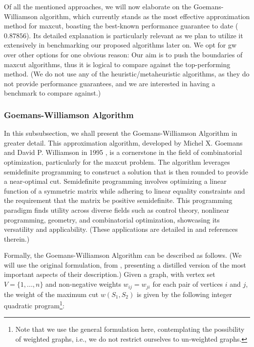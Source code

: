 Of all the mentioned approaches, we will now elaborate on the Goemans-Williamson algorithm, which currently stands as the most effective approximation method for \acrshort{maxcut}, boasting the best-known performance guarantee to date ($0.87856$). Its detailed explanation is particularly relevant as we plan to utilize it extensively in benchmarking our proposed algorithms later on. We opt for \acrshort{gw} over other options for one obvious reason: Our aim is to push the boundaries of \acrshort{maxcut} algorithms, thus it is logical to compare against the top-performing method. (We do not use any of the heuristic/metaheuristic algorithms, as they do not provide performance guarantees, and we are interested in having a benchmark to compare against.)

\subsubsection{Goemans-Williamson Algorithm}
\label{subsubsection:GW_Algorithm}

In this subsubsection, we shall present the Goemans-Williamson Algorithm in greater detail. This approximation algorithm, developed by Michel X. Goemans and David P. Williamson in 1995 \cite{GW-Algorithm}, is a cornerstone in the field of combinatorial optimization, particularly for the \acrshort{maxcut} problem. The algorithm leverages semidefinite programming to construct a solution that is then rounded to provide a near-optimal cut. Semidefinite programming involves optimizing a linear function of a symmetric matrix while adhering to linear equality constraints and the requirement that the matrix be positive semidefinite. This programming paradigm finds utility across diverse fields such as control theory, nonlinear programming, geometry, and combinatorial optimization, showcasing its versatility and applicability. (These applications are detailed in \cite{GW-Algorithm} and references therein.)

Formally, the Goemans-Williamson Algorithm can be described as follows. (We will use the original formulation, from \cite{GW-Algorithm}, presenting a distilled version of the most important aspects of their description.) Given a graph, with vertex set $V = \{1,..., n\}$ and non-negative weights $w_{ij} = w_{ji}$ for each pair of vertices $i$ and $j$, the weight of the maximum cut $w(S_1, S_2)$ is given by the following integer quadratic program\footnote{Note that we use the general formulation here, contemplating the possibility of weighted graphs, i.e., we do not restrict ourselves to un-weighted graphs.}:

